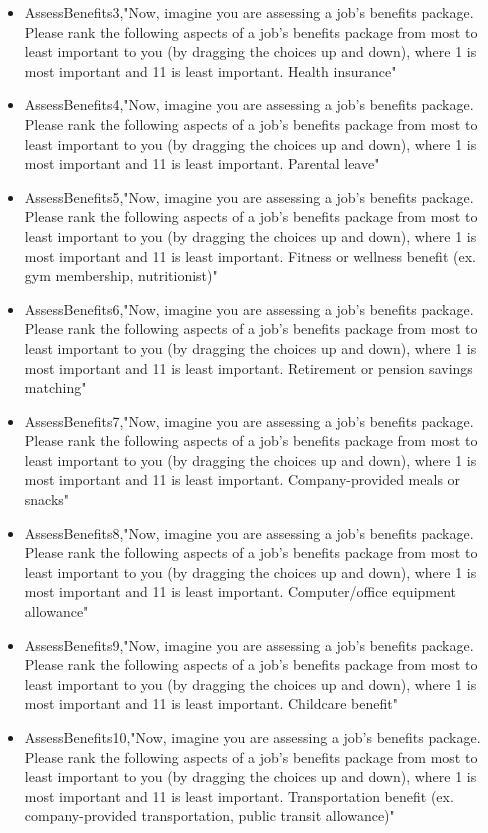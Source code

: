\begin{appendices}
\begin{itemize}
        \item AssessBenefits3,"Now, imagine you are assessing a job's benefits package. Please rank the following aspects of a job's benefits package from most to least important to you (by dragging the choices up and down), where 1 is most important and 11 is least important. Health insurance"
        \item AssessBenefits4,"Now, imagine you are assessing a job's benefits package. Please rank the following aspects of a job's benefits package from most to least important to you (by dragging the choices up and down), where 1 is most important and 11 is least important. Parental leave"
        \item AssessBenefits5,"Now, imagine you are assessing a job's benefits package. Please rank the following aspects of a job's benefits package from most to least important to you (by dragging the choices up and down), where 1 is most important and 11 is least important. Fitness or wellness benefit (ex. gym membership, nutritionist)"
        \item AssessBenefits6,"Now, imagine you are assessing a job's benefits package. Please rank the following aspects of a job's benefits package from most to least important to you (by dragging the choices up and down), where 1 is most important and 11 is least important. Retirement or pension savings matching"
        \item AssessBenefits7,"Now, imagine you are assessing a job's benefits package. Please rank the following aspects of a job's benefits package from most to least important to you (by dragging the choices up and down), where 1 is most important and 11 is least important. Company-provided meals or snacks"
        \item AssessBenefits8,"Now, imagine you are assessing a job's benefits package. Please rank the following aspects of a job's benefits package from most to least important to you (by dragging the choices up and down), where 1 is most important and 11 is least important. Computer/office equipment allowance"
        \item AssessBenefits9,"Now, imagine you are assessing a job's benefits package. Please rank the following aspects of a job's benefits package from most to least important to you (by dragging the choices up and down), where 1 is most important and 11 is least important. Childcare benefit"
        \item AssessBenefits10,"Now, imagine you are assessing a job's benefits package. Please rank the following aspects of a job's benefits package from most to least important to you (by dragging the choices up and down), where 1 is most important and 11 is least important. Transportation benefit (ex. company-provided transportation, public transit allowance)"

\end{itemize}
\end{appendices}
